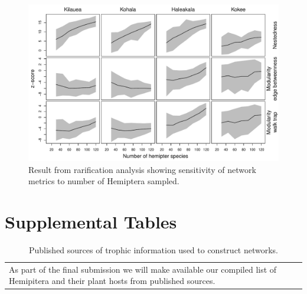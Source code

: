\documentclass[12pt]{article}
\begin{document}
\begin{figure}[!hp]
  \centering
  \includegraphics[scale=0.6]{figSupp_rarified_prob1.pdf}
  \caption{Result from rarification analysis showing sensitivity of
    network metrics to number of Hemiptera sampled.}
  \label{figSupp:rfy}
\end{figure}

\clearpage

\section*{Supplemental Tables}

\begin{table}[!htb]
  \centering
  \begin{tabular}{p{\textwidth}}
    As part of the final submission we will make available our compiled
    list of Hemipitera and their plant hosts from published sources.
  \end{tabular}
  \caption{Published sources of trophic information used to construct networks.}
  \label{tab:networkPubs}
\end{table}
\end{document}
